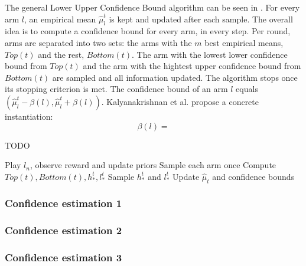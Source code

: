 The general Lower Upper Confidence Bound algorithm can be seen in
. For every arm $l$, an empirical mean $\hat{\mu}_l^t$ is kept
and updated after each sample. The overall idea is to compute a confidence bound
for every arm, in every step. Per round, arms are separated into two sets: the
arms with the $m$ best empirical means, $Top(t)$ and the rest, $Bottom(t)$. The
arm with the lowest lower confidence bound from $Top(t)$ and the arm with the
hightest upper confidence bound from $Bottom(t)$ are sampled and all information
updated. The algorithm stops once its stopping criterion is met. The confidence
bound of an arm $l$ equals $(\hat{\mu}_l^t - \beta(l), \hat{\mu}_l^t +
\beta(l))$. Kalyanakrishnan et al. \cite{DBLP:conf/icml/KalyanakrishnanTAS12}
propose a concrete instantiation:
\[\beta(l) = \]
\begin{algorithm}[H]
    \caption{TODO}
    \label{alg:LUCB1}
  \begin{algorithmic}
    \State Play $l_n$, observe reward and update priors
    \State Sample each arm once
    \Repeat
      \State Compute $Top(t), Bottom(t), h_*^t, l_*^t$
      \State Sample $h_*^t$ and $l_*^t$
      \State Update $\hat{\mu}_t$ and confidence bounds
    \Until{$ \mu < \epsilon$}
  \end{algorithmic}
\end{algorithm}


\subsubsection{Confidence estimation 1}
\subsubsection{Confidence estimation 2}
\subsubsection{Confidence estimation 3}
